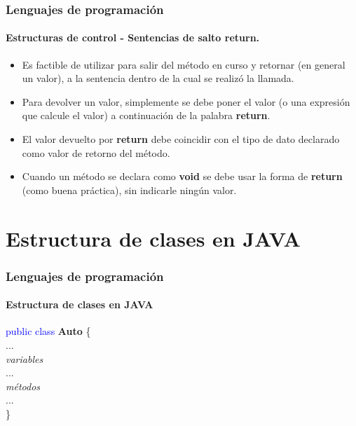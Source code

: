 \documentclass{beamer}
\begin{document}
		\begin{frame}
			\frametitle{Lenguajes de programaci\'on}
			\framesubtitle{Estructuras de control - Sentencias de salto \textbf{return}.}

			\begin{itemize}
				\item Es factible de utilizar para salir del m\'etodo en curso y retornar (en general un valor), a la sentencia dentro de la cual se realiz\'o la llamada.
				\item Para devolver un valor, simplemente se debe poner el valor (o una expresi\'on que calcule el valor) a continuaci\'on de la palabra \textbf{return}.
				\item El valor devuelto por \textbf{return} debe coincidir con el tipo de dato declarado como valor de retorno del m\'etodo.
				\item Cuando un m\'etodo se declara como \textbf{void} se debe usar la forma de \textbf{return} (como buena pr\'actica), sin indicarle ning\'un valor.
			\end{itemize}
		\end{frame}	
	
	\section{Estructura de clases en JAVA}

		\begin{frame}
			\frametitle{Lenguajes de programaci\'on}
			\framesubtitle{Estructura de clases en JAVA}

			\begin{block}{}
				\textcolor{blue}{public class} \textbf{Auto} \{ \\
				\hspace{1cm} ... \\
				\hspace{1cm} \emph{variables} \\
				\hspace{1cm} ... \\
				\hspace{1cm} \emph{m\'etodos} \\
				\hspace{1cm} ... \\
				\}
			\end{block}
		\end{frame}
\end{document}
